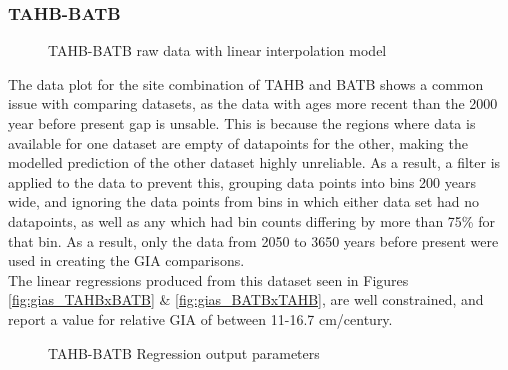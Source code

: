 \subsubsection{TAHB-BATB}

\begin{figure}[h]
	\caption{TAHB-BATB raw data with linear interpolation model}
	\label{fig:data_TAHBxBATB}
\end{figure}

The data plot for the site combination of TAHB and BATB shows a common issue
with comparing datasets, as the data with ages more recent than the 2000 year before
present gap is unsable. This is because the regions where data is available for
one dataset are empty of datapoints for the other, making the modelled prediction
of the other dataset highly unreliable. As a result, a filter is applied to the
data to prevent this, grouping data points into bins 200 years wide, and
ignoring the data points from bins in which either data set had no datapoints,
as well as any which had bin counts differing by more than 75\% for that bin.
As a result, only the data from 2050 to 3650 years before present were used in
creating the GIA comparisons.\\
The linear regressions produced from this dataset seen in Figures 
\ref{fig:gias_TAHBxBATB} \& \ref{fig:gias_BATBxTAHB}, are well constrained, and
report a value for relative GIA of between 11-16.7 cm/century.


\begin{figure}[h]
	\begin{flushleft}
	\end{flushleft}
	\caption{TAHB-BATB Regression output parameters}
	\label{fig:TAHBxBATB_regression}
\end{figure}


